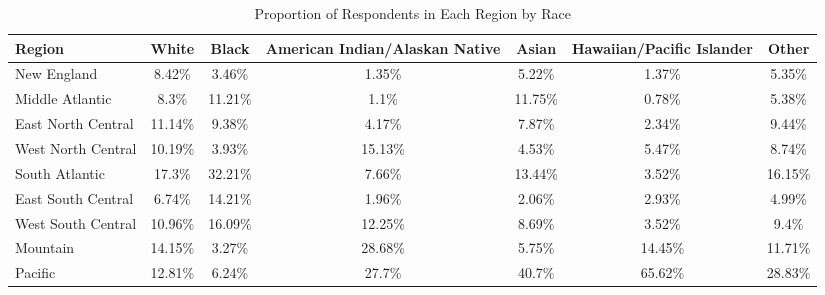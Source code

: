 \documentclass{article}
\begin{document}
\begin{table}[ht]
\centering
\begin{tabular}{lcccccc}
  \hline
 Region & White & Black & American Indian/Alaskan Native & Asian & Hawaiian/Pacific Islander & Other \\ 
  \hline
  New England & 8.42\% & 3.46\% & 1.35\% & 5.22\% & 1.37\% & 5.35\% \\ 
  Middle Atlantic & 8.3\% & 11.21\% & 1.1\% & 11.75\% & 0.78\% & 5.38\% \\ 
  East North Central & 11.14\% & 9.38\% & 4.17\% & 7.87\% & 2.34\% & 9.44\% \\ 
  West North Central & 10.19\% & 3.93\% & 15.13\% & 4.53\% & 5.47\% & 8.74\% \\ 
  South Atlantic & 17.3\% & 32.21\% & 7.66\% & 13.44\% & 3.52\% & 16.15\% \\ 
  East South Central & 6.74\% & 14.21\% & 1.96\% & 2.06\% & 2.93\% & 4.99\% \\ 
  West South Central & 10.96\% & 16.09\% & 12.25\% & 8.69\% & 3.52\% & 9.4\% \\ 
  Mountain & 14.15\% & 3.27\% & 28.68\% & 5.75\% & 14.45\% & 11.71\% \\ 
  Pacific & 12.81\% & 6.24\% & 27.7\% & 40.7\% & 65.62\% & 28.83\% \\ 
   \hline
\end{tabular}
\caption*{Proportion of Respondents in Each Region by Race} 
\end{table}
\end{document}
